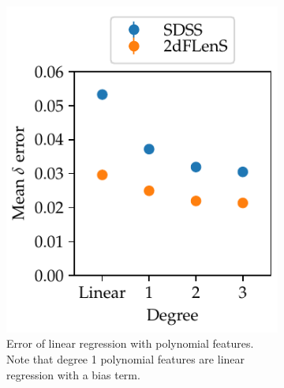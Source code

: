 \documentclass[11pt,twoside,openright]{report}
\begin{document}
\begin{figure}
  \centering
  \begin{subfigure}{0.4\textwidth}
    \centering
    \includegraphics[width=\textwidth]{linreg_polynomial.pdf}
    \caption{Error of linear regression with polynomial features. Note that degree 1 polynomial features are linear regression with a bias term.}
    \label{fig:linreg_polynomial}
  \end{subfigure}\hspace{0.1\textwidth}
  \begin{subfigure}{0.4\textwidth}
    \centering

\end{subfigure}
\end{figure}
\end{document}

